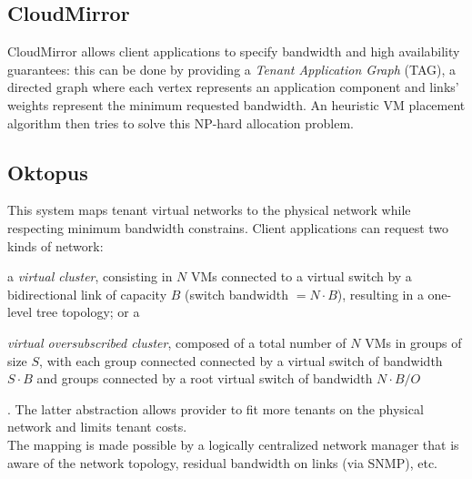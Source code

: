 \documentclass[a4paper, 11pt]{article}
\begin{document}
\subsection{CloudMirror \cite{cloudmirror}}
CloudMirror \cite{cloudmirror} allows client applications to specify bandwidth and high availability guarantees: this can be done by providing a \textit{Tenant Application Graph} (TAG), a directed graph where each vertex represents an application component and links' weights represent the minimum requested bandwidth. An heuristic VM placement algorithm then tries to solve this NP-hard allocation problem.
\subsection{Oktopus \cite{oktopus}}
This system maps tenant virtual networks to the physical network while respecting minimum bandwidth constrains. Client applications can request two kinds of network:
\begin{mylist}
    \item a \textit{virtual cluster}, consisting in $N$ VMs connected to a virtual switch by a bidirectional link of capacity $B$ (switch bandwidth $= N \cdot B$), resulting in a one-level tree topology; or a
    \item \textit{virtual oversubscribed cluster}, composed of a total number of $N$ VMs in groups of size $S$, with each group connected connected by a virtual switch of bandwidth $S \cdot B$ and groups connected by a root virtual switch of bandwidth $N \cdot B / O$
\end{mylist}.
The latter abstraction allows provider to fit more tenants on the physical network and limits tenant costs.\\
The mapping is made possible by a logically centralized network manager that is aware of the network topology, residual bandwidth on links (via SNMP), etc.



\end{document}
